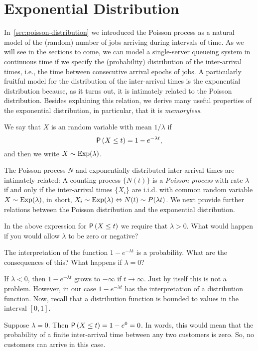\documentclass[companion]{subfiles}
\begin{document}
\section{Exponential Distribution}
\label{sec:expon-distr}

In~\cref{sec:poisson-distribution} we introduced the Poisson process as a natural model of the (random) number of jobs arriving during intervals of time.
As we will see in the sections to come, we can model a single-server queueing system in continuous time if we specify the (probability) distribution of the inter-arrival times, i.e., the time between consecutive arrival epochs of jobs.
A particularly fruitful model for the distribution of the inter-arrival times is the exponential distribution because, as it turns out, it is intimately related to the Poisson distribution.
Besides explaining this relation, we derive many useful properties of the exponential distribution, in particular, that it is \emph{memoryless}.




We say that $X$ is an  random variable with mean $1/\lambda$ if 
\begin{equation*}
 \P{X \leq t} = 1- e^{-\lambda t},
\end{equation*}
and then we write $X\sim \operatorname{Exp}(\lambda)$.


The Poisson process $N$ and exponentially distributed inter-arrival times are intimately related: A counting process $\{N(t)\}$ is a \emph{Poisson process} with rate $\lambda$ if and only if the inter-arrival times $\{X_i\}$ are i.i.d.
with common random variable $X\sim \operatorname{Exp}(\lambda)$, in short, $X_i\sim \operatorname{Exp}(\lambda) \Leftrightarrow N(t) \sim P(\lambda t)$.
We next provide further relations between the Poisson distribution and the exponential distribution.


\begin{extra}
In the above expression for $\P{X\leq t}$ we require that $\lambda>0$. What would happen if you would allow $\lambda$ to be zero or negative?
\begin{hint}
 The interpretation of the function $1-e^{-\lambda t}$ is a probability. What are the consequences of this? What happens if $\lambda=0$?
\end{hint}
\begin{solution}
 If $\lambda<0$, then $1-e^{-\lambda t}$ grows to $-\infty$ if $t\to \infty$. Just by itself this is not a problem. However, in our case $1-e^{-\lambda t}$ has the interpretation of a distribution function. Now, recall that a distribution function is bounded to values in the interval $[0,1]$.

Suppose $\lambda=0$. Then $\P{X\leq t} = 1-e^{0} = 0$. In words, this would mean that the probability of a finite inter-arrival time between any two customers is zero. So, no customers can arrive in this case. 
\end{solution}
\end{extra}
\end{document}
